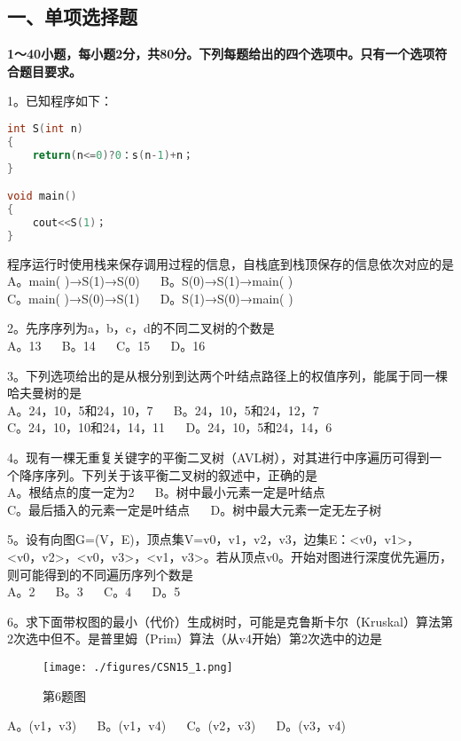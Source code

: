 
\subsection{一、单项选择题}
\textbf{1～40小题，每小题2分，共80分。下列每题给出的四个选项中。只有一个选项符合题目要求。}

1。已知程序如下： \\
\begin{lstlisting}[language=cpp]
int S(int n)
{
    return(n<=0)?0：s(n-1)+n；
}

void main()
{ 
    cout<<S(1)；
}
\end{lstlisting}
程序运行时使用栈来保存调用过程的信息，自栈底到栈顶保存的信息依次对应的是 \\
A。main( )→S(1)→S(0) $\quad$ B。S(0)→S(1)→main( ) \\
C。main( )→S(0)→S(1) $\quad$ D。S(1)→S(0)→main( )

2。先序序列为a，b，c，d的不同二叉树的个数是 \\
A。13 $\quad$ B。14 $\quad$ C。15 $\quad$ D。16

3。下列选项给出的是从根分别到达两个叶结点路径上的权值序列，能属于同一棵哈夫曼树的是 \\
A。24，10，5和24，10，7 $\quad$ B。24，10，5和24，12，7 \\
C。24，10，10和24，14，11 $\quad$ D。24，10，5和24，14，6

4。现有一棵无重复关键字的平衡二叉树（AVL树），对其进行中序遍历可得到一个降序序列。下列关于该平衡二叉树的叙述中，正确的是 \\
A。根结点的度一定为2 $\quad$ B。树中最小元素一定是叶结点 \\
C。最后插入的元素一定是叶结点 $\quad$ D。树中最大元素一定无左子树

5。设有向图G=(V，E)，顶点集V={v0，v1，v2，v3}，边集E：{<v0，v1>，<v0，v2>，<v0，v3>，<v1，v3>}。若从顶点v0。开始对图进行深度优先遍历，则可能得到的不同遍历序列个数是 \\
A。2 $\quad$ B。3 $\quad$ C。4 $\quad$ D。5

6。求下面带权图的最小（代价）生成树时，可能是克鲁斯卡尔（Kruskal）算法第2次选中但不。是普里姆（Prim）算法（从v4开始）第2次选中的边是
\begin{figure}[ht]
\centering
\texttt{[image: ./figures/CSN15\_1.png]}
\caption{第6题图} \label{CSN15_fig1}
\end{figure}
A。(v1，v3) $\quad$ B。(v1，v4) $\quad$ C。(v2，v3) $\quad$ D。(v3，v4)

